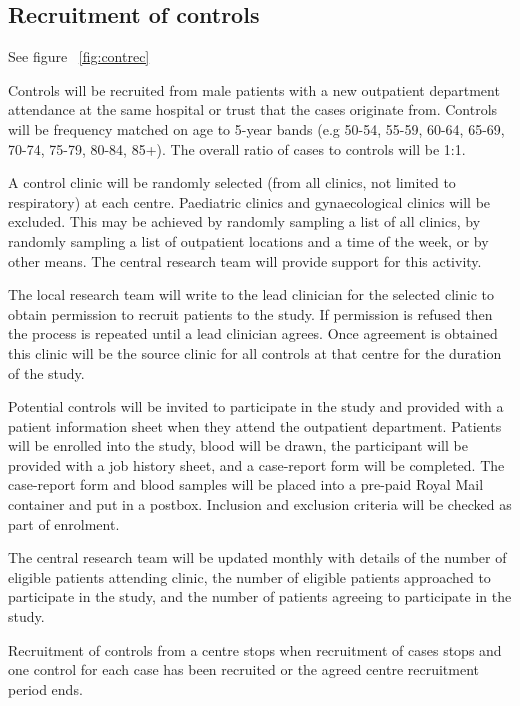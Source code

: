 \documentclass[a4paper,10pt]{article}
\begin{document}
\subsection{Recruitment of controls}

See figure ~\ref{fig:contrec}

 Controls will be recruited from male patients with a new outpatient department attendance at the same hospital or trust that the cases originate from. Controls will be frequency matched on age to 5-year bands (e.g 50-54, 55-59, 60-64, 65-69, 70-74, 75-79, 80-84, 85+). The overall ratio of cases to controls will be 1:1.  

A control clinic will be randomly selected (from all clinics, not limited to respiratory) at each centre. Paediatric clinics and gynaecological clinics will be excluded. This may be achieved by randomly sampling a list of all clinics, by randomly sampling a list of outpatient locations and a time of the week, or by other means. The central research team will provide support for this activity. 

The local research team will write to the lead clinician for the selected clinic to obtain permission to recruit patients to the study. If permission is refused then the process is repeated until a lead clinician agrees. Once agreement is obtained this clinic will be the source clinic for all controls at that centre for the duration of the study.
 
Potential controls will be invited to participate in the study and provided with a patient information sheet when they attend the outpatient department. Patients will be enrolled into the study, blood will be drawn, the participant will be provided with a job history sheet, and a case-report form will be completed. The case-report form and blood samples will be placed into a pre-paid Royal Mail container and put in a postbox. Inclusion and exclusion criteria will be checked as part of enrolment.

The central research team will be updated monthly with details of the number of eligible patients attending clinic, the number of eligible patients approached to participate in the study, and the number of patients agreeing to participate in the study.

Recruitment of controls from a centre stops when recruitment of cases stops and one control for each case has been recruited or the agreed centre recruitment period ends.
\end{document}
